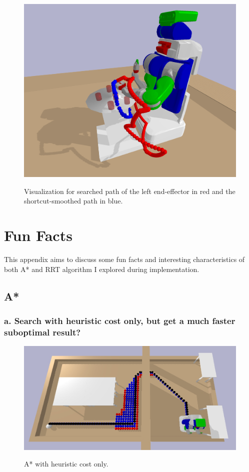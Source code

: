 \documentclass{article}
\theoremstyle{definition} %
\begin{document}
\begin{figure}[H]
    \centering
        \textsf{\includegraphics[width=0.7\columnwidth]{rrt_smoothed.png}}
        \caption{Visualization for searched path of the left end-effector in red and the shortcut-smoothed path in blue.}
        \label{fig:rrt_smoothed}
\end{figure}

\clearpage %
\appendix

\section{Fun Facts}
This appendix aims to discuss some fun facts and interesting characteristics of both A* and RRT algorithm I explored during implementation.

\subsection*{A*}
\subsubsection*{a. Search with heuristic cost only, but get a much faster suboptimal result?}

\begin{figure}[h]
    \centering
        \textsf{\includegraphics[width=0.8\columnwidth]{astar_no_gcost.png}}
        \caption{A* with heuristic cost only.}
        \label{fig:astar_no_gcost}
\end{figure}
\end{document}
